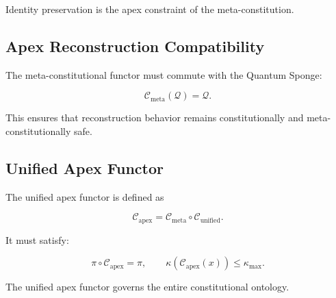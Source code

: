Identity preservation is the apex constraint of the meta-constitution.


\subsection{Apex Reconstruction Compatibility}

The meta-constitutional functor must commute with the Quantum Sponge:

\[
\mathcal{C}_{\mathrm{meta}}(\mathcal{Q}) = \mathcal{Q}.
\]

This ensures that reconstruction behavior remains constitutionally and
meta-constitutionally safe.


\subsection{Unified Apex Functor}

The unified apex functor is defined as

\[
\mathcal{C}_{\mathrm{apex}}
=
\mathcal{C}_{\mathrm{meta}}
\circ
\mathcal{C}_{\mathrm{unified}}.
\]

It must satisfy:

\[
\pi \circ \mathcal{C}_{\mathrm{apex}} = \pi,
\qquad
\kappa(\mathcal{C}_{\mathrm{apex}}(x)) \le \kappa_{\max}.
\]

The unified apex functor governs the entire constitutional ontology.

